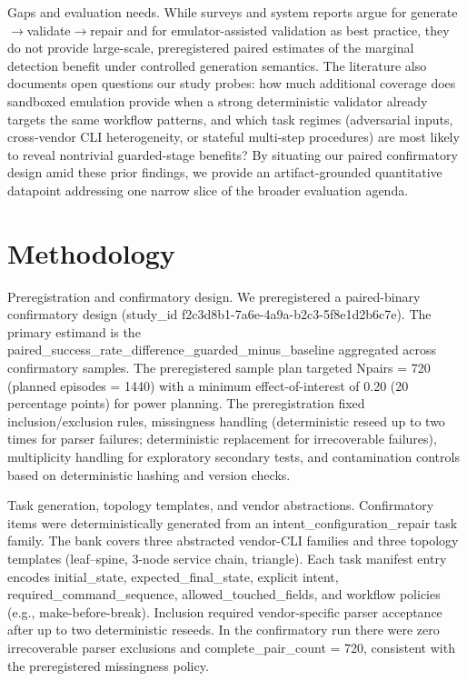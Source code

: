 \documentclass[conference]{IEEEtran}
\begin{document}
Gaps and evaluation needs. While surveys and system reports argue for generate\ensuremath{\rightarrow}validate\ensuremath{\rightarrow}repair and for emulator-assisted validation as best practice, they do not provide large-scale, preregistered paired estimates of the marginal detection benefit under controlled generation semantics. The literature also documents open questions our study probes: how much additional coverage does sandboxed emulation provide when a strong deterministic validator already targets the same workflow patterns, and which task regimes (adversarial inputs, cross‑vendor CLI heterogeneity, or stateful multi-step procedures) are most likely to reveal nontrivial guarded-stage benefits? By situating our paired confirmatory design amid these prior findings, we provide an artifact-grounded quantitative datapoint addressing one narrow slice of the broader evaluation agenda.

\section{Methodology}
Preregistration and confirmatory design. We preregistered a paired-binary confirmatory design (study\_id f2c3d8b1-7a6e-4a9a-b2c3-5f8e1d2b6c7e). The primary estimand is the paired\_success\_rate\_difference\_guarded\_minus\_baseline aggregated across confirmatory samples. The preregistered sample plan targeted Npairs = 720 (planned episodes = 1440) with a minimum effect-of-interest of 0.20 (20 percentage points) for power planning. The preregistration fixed inclusion/exclusion rules, missingness handling (deterministic reseed up to two times for parser failures; deterministic replacement for irrecoverable failures), multiplicity handling for exploratory secondary tests, and contamination controls based on deterministic hashing and version checks.

Task generation, topology templates, and vendor abstractions. Confirmatory items were deterministically generated from an intent\_configuration\_repair task family. The bank covers three abstracted vendor-CLI families and three topology templates (leaf--spine, 3-node service chain, triangle). Each task manifest entry encodes initial\_state, expected\_final\_state, explicit intent, required\_command\_sequence, allowed\_touched\_fields, and workflow policies (e.g., make-before-break). Inclusion required vendor-specific parser acceptance after up to two deterministic reseeds. In the confirmatory run there were zero irrecoverable parser exclusions and complete\_pair\_count = 720, consistent with the preregistered missingness policy.
\end{document}
